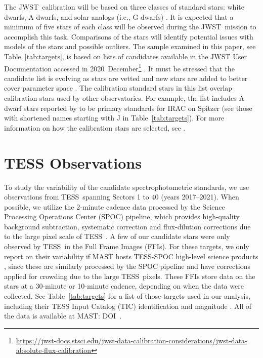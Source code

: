 \documentclass[twocolumn, linenumbers]{aastex631}
\newcommand{\webb}{JWST}
\newcommand{\jwst}{JWST}
\newcommand{\tess}{TESS}
\begin{document}
The \webb\ calibration will be based on three classes of standard stars:  white dwarfs, A dwarfs, and solar analogs (i.e., G dwarfs) \citep{Gordon2022inprep}.  It is expected that a minimum of five stars of each class will be observed during the \jwst\ mission to accomplish this task.  Comparisons of the stars will identify potential issues with models of the stars and possible outliers.  The sample examined in this paper, see Table~\ref{tab:targets}, is based on lists of candidates available in the JWST User Documentation accessed in 2020~December\footnote{\url{https://jwst-docs.stsci.edu/jwst-data-calibration-considerations/jwst-data-absolute-flux-calibration}} \citep{jdox}.  It must be stressed that the candidate list is evolving as stars are vetted and new stars are added to better cover parameter space \citep{Gordon2022inprep}.  The calibration standard stars in this list overlap calibration stars used by other observatories. For example, the list includes A dwarf stars reported by \citet{Reach2005} to be primary standards for IRAC on Spitzer (see those with shortened names starting with J in Table~\ref{tab:targets}). For more information on how the calibration stars are selected, see \citet{Gordon2022inprep}.



\section{TESS Observations}
\label{sec:obs}

To study the variability of the candidate spectrophotometric standards, we use observations from \tess\ spanning Sectors 1 to 40 (years 2017--2021). When possible, we utilize the 2-minute cadence data processed by the Science Processing Operations Center (SPOC) pipeline, which provides high-quality background subtraction, systematic correction and flux-dilution corrections due to the large pixel scale of \tess\ \citep{kdph2020ksciApertures,kdph2020ksciCal,kdph2020ksciPA,kdph2020PDC}. A few of our candidate stars were only observed by \tess\ in the Full Frame Images (FFIs). For these targets, we only report on their variability if MAST hosts \tess-SPOC high-level science products \citep{Caldwell2020spoc}, since these are similarly processed by the SPOC pipeline and have corrections applied for crowding due to the large \tess\ pixels. These FFIs store data on the stars at a 30-minute or 10-minute cadence, depending on when the data were collected. See Table~\ref{tab:targets} for a list of those targets used in our analysis, including their TESS Input Catalog (TIC) identification and magnitude \citep{Stassun2018TIC}. All of the data is available at MAST: DOI\, .
\end{document}
